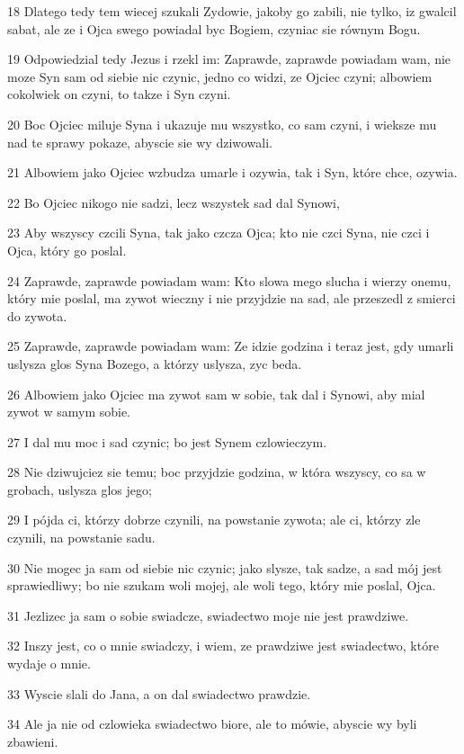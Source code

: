 \par 18 Dlatego tedy tem wiecej szukali Zydowie, jakoby go zabili, nie tylko, iz gwalcil sabat, ale ze i Ojca swego powiadal byc Bogiem, czyniac sie równym Bogu.
\par 19 Odpowiedzial tedy Jezus i rzekl im: Zaprawde, zaprawde powiadam wam, nie moze Syn sam od siebie nic czynic, jedno co widzi, ze Ojciec czyni; albowiem cokolwiek on czyni, to takze i Syn czyni.
\par 20 Boc Ojciec miluje Syna i ukazuje mu wszystko, co sam czyni, i wieksze mu nad te sprawy pokaze, abyscie sie wy dziwowali.
\par 21 Albowiem jako Ojciec wzbudza umarle i ozywia, tak i Syn, które chce, ozywia.
\par 22 Bo Ojciec nikogo nie sadzi, lecz wszystek sad dal Synowi,
\par 23 Aby wszyscy czcili Syna, tak jako czcza Ojca; kto nie czci Syna, nie czci i Ojca, który go poslal.
\par 24 Zaprawde, zaprawde powiadam wam: Kto slowa mego slucha i wierzy onemu, który mie poslal, ma zywot wieczny i nie przyjdzie na sad, ale przeszedl z smierci do zywota.
\par 25 Zaprawde, zaprawde powiadam wam: Ze idzie godzina i teraz jest, gdy umarli uslysza glos Syna Bozego, a którzy uslysza, zyc beda.
\par 26 Albowiem jako Ojciec ma zywot sam w sobie, tak dal i Synowi, aby mial zywot w samym sobie.
\par 27 I dal mu moc i sad czynic; bo jest Synem czlowieczym.
\par 28 Nie dziwujciez sie temu; boc przyjdzie godzina, w która wszyscy, co sa w grobach, uslysza glos jego;
\par 29 I pójda ci, którzy dobrze czynili, na powstanie zywota; ale ci, którzy zle czynili, na powstanie sadu.
\par 30 Nie mogec ja sam od siebie nic czynic; jako slysze, tak sadze, a sad mój jest sprawiedliwy; bo nie szukam woli mojej, ale woli tego, który mie poslal, Ojca.
\par 31 Jezlizec ja sam o sobie swiadcze, swiadectwo moje nie jest prawdziwe.
\par 32 Inszy jest, co o mnie swiadczy, i wiem, ze prawdziwe jest swiadectwo, które wydaje o mnie.
\par 33 Wyscie slali do Jana, a on dal swiadectwo prawdzie.
\par 34 Ale ja nie od czlowieka swiadectwo biore, ale to mówie, abyscie wy byli zbawieni.
